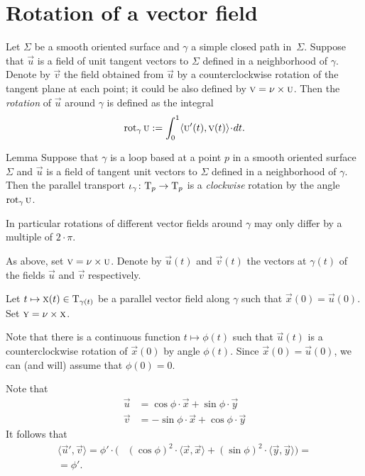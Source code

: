 \section{Rotation of a vector field}

Let $\Sigma$ be a smooth oriented surface and $\gamma$ a simple closed path in~$\Sigma$.
Suppose that $\vec u$ is a field of unit tangent vectors to $\Sigma$ defined in a neighborhood of $\gamma$.
Denote by $\vec v$ the field obtained from $\vec u$ by a counterclockwise rotation of the tangent plane at each point; it could be also defined by $\textsc v=\nu\times\textsc u$.
Then the \emph{rotation} of $\vec u$ around $\gamma$ is defined as the integral
\[\rot_\gamma\vec u
\df
\int_0^1\langle\vec u'(t),\vec v(t)\rangle\cdot dt.\]

\begin{thm}{Lemma}\label{lem:rotation-parallel}
Suppose that $\gamma$ is a loop based at a point $p$ in a smooth oriented surface $\Sigma$ and $\vec u$ is a field of tangent unit vectors to $\Sigma$ defined in a neighborhood of $\gamma$.
Then the parallel transport $\iota_\gamma\colon\mathrm{T}_p\to\mathrm{T}_p$ is a {}\emph{clockwise} rotation by the angle $\mathop{\rm rot}\nolimits_\gamma\textsc u$.

In particular rotations of different vector fields around $\gamma$ may only differ by a multiple of $2\cdot\pi$.
\end{thm}

As above, set $\textsc v=\nu\times\textsc u$. 
Denote by $\vec u(t)$ and $\vec v(t)$ the vectors at $\gamma(t)$ of the fields $\vec u$ and $\vec v$ respectively.

Let $t\mapsto \textsc x(t)\in \mathrm{T}_{\gamma(t)}$ be a parallel vector field along $\gamma$ such that $\vec x(0)=\vec u(0)$.
Set $\textsc y=\nu\times\textsc x$.

Note that there is a continuous function $t\mapsto \phi(t)$ such that 
$\vec u(t)$ is a counterclockwise rotation of $\vec x(0)$ by angle $\phi(t)$.
Since $\vec x(0)=\vec u(0)$, we can (and will) assume that $\phi(0)=0$.

Note that
\begin{align*}
\vec u&=\cos\phi\cdot \vec x+\sin\phi\cdot \vec y
\\
\vec v&=-\sin\phi\cdot \vec x+\cos\phi\cdot \vec y
\end{align*}
It follows that 
\begin{align*}
\langle\vec u',\vec v\rangle
=\phi'\cdot\biggl(&(\cos\phi)^2\cdot \langle\vec x,\vec x\rangle+(\sin\phi)^2\cdot \langle\vec y,\vec y\rangle
\biggr)=
\\
=\phi'.\ &
\end{align*}

